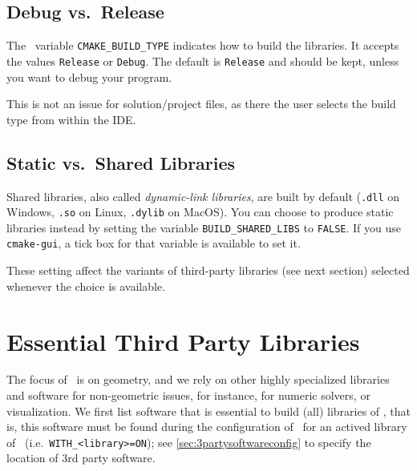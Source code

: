 \addtocounter{footnote}{1}




\subsection{Debug vs.\ Release}

The \cmake\ variable \texttt{CMAKE\_BUILD\_TYPE} indicates how to build
the libraries. It accepts the values \texttt{Release} or
\texttt{Debug}. The default is \texttt{Release} and should be kept, unless you want to debug
your program.

This is not an issue for solution/project files, as there the user selects the build type from within the IDE.

\subsection{Static vs.\ Shared Libraries }

Shared libraries, also called \emph{dynamic-link libraries}, are built by default
(\texttt{.dll} on Windows, \texttt{.so} on Linux, \texttt{.dylib} on MacOS).  You
can choose to produce static libraries instead by setting the \cmake{}
variable \texttt{BUILD\_SHARED\_LIBS} to \texttt{FALSE}.  If you use
\texttt{cmake-gui}, a tick box for that variable is available to set it.

These setting affect the variants of third-party libraries (see next
section) selected whenever the choice is available.

\section{Essential Third Party Libraries\label{sec:essential3rdpartysoftware}}

The focus of \cgal\ is on geometry, and we rely on other
highly specialized libraries and software for non-geometric issues,
for instance, for numeric solvers, or visualization. We first list software
that is essential to build (all) libraries of \cgal, that is, 
this software must be found during the configuration of \cgal\ for an
actived library of \cgal\ (i.e.~\texttt{WITH\_<library>=ON});
see \ref{sec:3partysoftwareconfig} to specify the location of 3rd
party software.

